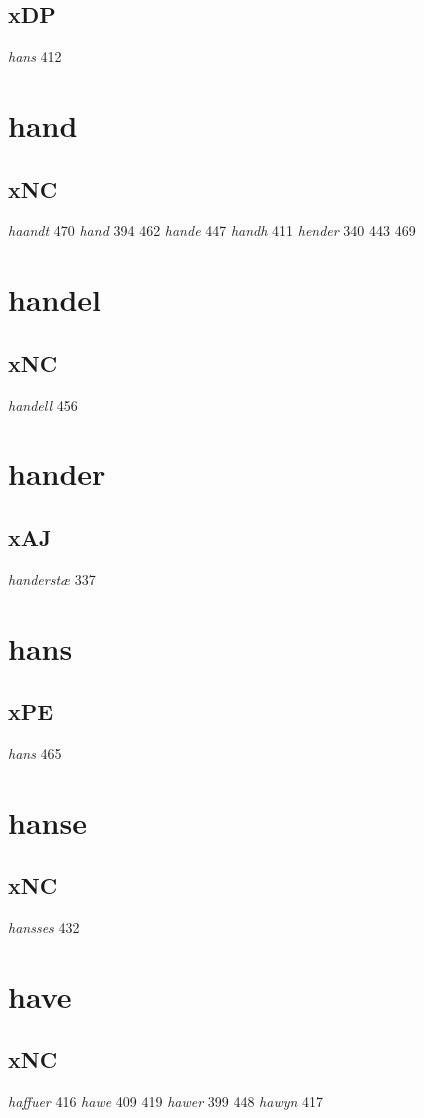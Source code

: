 \documentclass[a4paper,twocolumn]{article}
\begin{document}
\subsection{xDP}
\label{sec:org9d2f860}
\emph{hans} 412 
\section{hand}
\label{sec:org6068ffb}
\subsection{xNC}
\label{sec:orgb8a3ae2}
\emph{haandt} 470 \emph{hand} 394 462 \emph{hande} 447 \emph{handh} 411 \emph{hender} 340 443 469 
\section{handel}
\label{sec:org8394c0f}
\subsection{xNC}
\label{sec:orgadd51fb}
\emph{handell} 456 
\section{hander}
\label{sec:org10c2af1}
\subsection{xAJ}
\label{sec:org58eb567}
\emph{handerstæ} 337 
\section{hans}
\label{sec:orga9a65d3}
\subsection{xPE}
\label{sec:orge2e940a}
\emph{hans} 465 
\section{hanse}
\label{sec:org4705098}
\subsection{xNC}
\label{sec:org17a2e65}
\emph{hansses} 432 
\section{have}
\label{sec:org0f3c2fa}
\subsection{xNC}
\label{sec:org6565281}
\emph{haffuer} 416 \emph{hawe} 409 419 \emph{hawer} 399 448 \emph{hawyn} 417 
\end{document}
